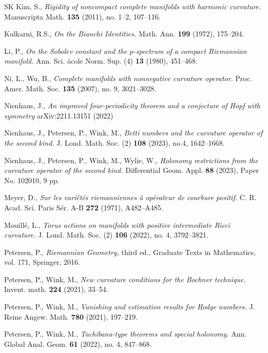 \documentclass[12pt, twoside]{article}
\theoremstyle{definition}
\numberwithin{equation}{section}
\begin{document}
\begin{thebibliography}{SK}
	Kim, S., 
	\textit{Rigidity of noncompact complete manifolds with harmonic curvature.}
	Manuscripta Math. \textbf{135} (2011), no. 1--2, 107--116.
	
	
	Kulkarni, R.S.,
	\textit{On the Bianchi Identities.}
	Math. Ann. \textbf{199} (1972), 175--204.
	
	Li, P.,
	\textit{On the Sobolev constant and the $p$-spectrum of a compact Riemannian manifold.} 
	Ann. Sci. \'{a}cole Norm. Sup. (4) \textbf{13} (1980), 451--468. 
	

	Ni, L., Wu, B.,
	\textit{Complete manifolds with nonnegative curvature operator.}
	Proc. Amer. Math. Soc. \textbf{135} (2007), no. 9, 3021--3028.
	
	Nienhaus, J.,
\textit{An improved four-periodicity theorem and a conjecture of Hopf with symmetry}
arXiv:2211.13151 (2022)


	
	
	Nienhaus, J., Petersen, P., Wink, M.,
	\textit{Betti numbers and the curvature operator of the second kind.}
	J. Lond. Math. Soc. (2) \textbf{108} (2023), no.4, 1642--1668. 
	
	Nienhaus, J., Petersen, P., Wink, M., Wylie, W.,
	\textit{Holonomy restrictions from the curvature operator of the second kind.}
	Differential Geom. Appl. \textbf{88} (2023), Paper No. 102010, 9 pp. 
	

	
	
	Meyer, D.,
	\textit{Sur les vari\'{e}t\'{e}s riemanniennes \`{a} op\'{e}rateur de courbure positif.} 
	C. R. Acad. Sci. Paris S\'{e}r. A-B \textbf{272} (1971), A482--A485. 
	

Mouill\'{e}, L.,
\textit{Torus actions on manifolds with positive intermediate Ricci curvature.}
J. Lond. Math. Soc. (2) \textbf{106} (2022), no. 4, 3792--3821.

	
	Petersen, P.,
	\textit{Riemannian Geometry,}
	third ed., Graduate Texts in Mathematics, vol. 171, Springer, 2016.
	
	Petersen, P., Wink, M.,
	\textit{New curvature conditions for the Bochner technique.}
	Invent. math. \textbf{224} (2021), 33--54.
	
	Petersen, P., Wink, M.,
	\textit{Vanishing and estimation results for Hodge numbers.}
	J. Reine Angew. Math. \textbf{780} (2021), 197--219.
	
	Petersen, P., Wink, M.,
	\textit{Tachibana-type theorems and special holonomy.} Ann. Global Anal. Geom. \textbf{61} (2022), no. 4, 847--868.
	

\end{thebibliography}
\end{document}
